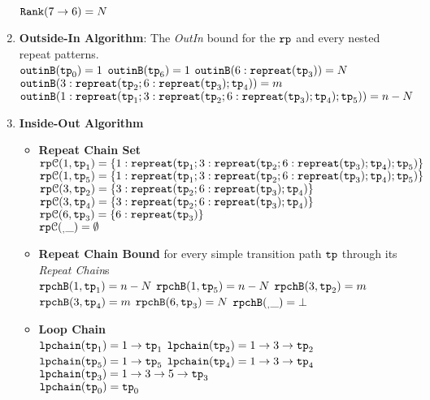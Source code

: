 \begin{enumerate}
  \quad ${\mathtt{Rank}}(7 \to 6) = N$ 
  \item \textbf{Outside-In Algorithm}: The \emph{OutIn} bound for the $\mathtt{rp}$ and every nested repeat patterns.
  \\
$\mathtt{outinB}(\mathtt{tp}_0) = 1$
\quad
$\mathtt{outinB}(\mathtt{tp}_6) = 1$
\quad
$\mathtt{outinB}(6 : \mathtt{repreat}(\mathtt{tp}_3)) = N $
\\
$\mathtt{outinB}(3: \mathtt{repreat}(\mathtt{tp}_2; 6 : \mathtt{repreat}(\mathtt{tp}_3); \mathtt{tp}_4)) = m $
\\
$\mathtt{outinB}(1: \mathtt{repreat}(\mathtt{tp}_1; 3: \mathtt{repreat}(\mathtt{tp}_2; 6 : \mathtt{repreat}(\mathtt{tp}_3); \mathtt{tp}_4); \mathtt{tp}_5)) = n - N $
\item \textbf{Inside-Out Algorithm}
\begin{itemize}
  \item \textbf{Repeat Chain Set}
  \\
  $\mathtt{rp}\mathcal{C}(1, \mathtt{tp}_1) = \{1: \mathtt{repreat}(\mathtt{tp}_1; 3: \mathtt{repreat}(\mathtt{tp}_2; 6 : \mathtt{repreat}(\mathtt{tp}_3); \mathtt{tp}_4); \mathtt{tp}_5)\}$
  \\
  $\mathtt{rp}\mathcal{C}(1, \mathtt{tp}_5) = \{1: \mathtt{repreat}(\mathtt{tp}_1; 3: \mathtt{repreat}(\mathtt{tp}_2; 6 : \mathtt{repreat}(\mathtt{tp}_3); \mathtt{tp}_4); \mathtt{tp}_5)\}$
  \\
  $\mathtt{rp}\mathcal{C}(3, \mathtt{tp}_2) = \{3: \mathtt{repreat}(\mathtt{tp}_2; 6 : \mathtt{repreat}(\mathtt{tp}_3); \mathtt{tp}_4)\}$
  \\
  $\mathtt{rp}\mathcal{C}(3, \mathtt{tp}_4) = \{3: \mathtt{repreat}(\mathtt{tp}_2; 6 : \mathtt{repreat}(\mathtt{tp}_3); \mathtt{tp}_4)\}$
  \\
  $\mathtt{rp}\mathcal{C}(6, \mathtt{tp}_3) = \{6: \mathtt{repreat}(\mathtt{tp}_3)\}$
  \\
  $\mathtt{rp}\mathcal{C}(_, \_) = \emptyset$ 
  \item \textbf{Repeat Chain Bound} for every simple transition path $\mathtt{tp}$ through its \emph{Repeat Chain}s
  \\
  $\mathtt{rpchB}(1, \mathtt{tp}_1) = n - N$ \quad
  $\mathtt{rpchB}(1, \mathtt{tp}_5) = n - N$ \quad
  $\mathtt{rpchB}(3, \mathtt{tp}_2) = m$ \\
  $\mathtt{rpchB}(3, \mathtt{tp}_4) = m$ \quad
  $\mathtt{rpchB}(6, \mathtt{tp}_3) = N$ \quad \quad 
  $\mathtt{rpchB}(_, \_) = \bot $ 
  \item \textbf{Loop Chain}
  \\
  $\mathtt{lpchain}(\mathtt{tp}_1) = 1\to \mathtt{tp}_1$ \quad
  $\mathtt{lpchain}(\mathtt{tp}_2) = 1 \to 3 \to \mathtt{tp}_2$ \\
  $\mathtt{lpchain}(\mathtt{tp}_5) = 1\to \mathtt{tp}_5$ \quad
  $\mathtt{lpchain}(\mathtt{tp}_4) = 1 \to 3 \to \mathtt{tp}_4$ \\
  \highlight
  {$\mathtt{lpchain}(\mathtt{tp}_3) = 1 \to 3 \to 5 \to \mathtt{tp}_3$ }\\
  $\mathtt{lpchain}(\mathtt{tp}_0) = \mathtt{tp}_0$ \quad

\end{itemize}
\end{enumerate}
